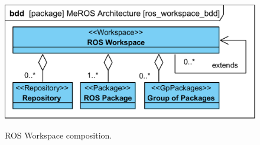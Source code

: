 \documentclass[11pt,oneside,a4paper]{report}
\begin{document}
	\begin{figure}[H]
		\centering
		\begin{center}
			{\includegraphics[scale=1.0]{diagrams/ros_workspace_bdd.png}}
		\end{center}
		\caption{ROS Workspace composition.} 
		\label{fig:ros_workspace_bdd}
	\end{figure}

			
\AtNextBibliography{\small}
\printbibliography
	
\end{document}
